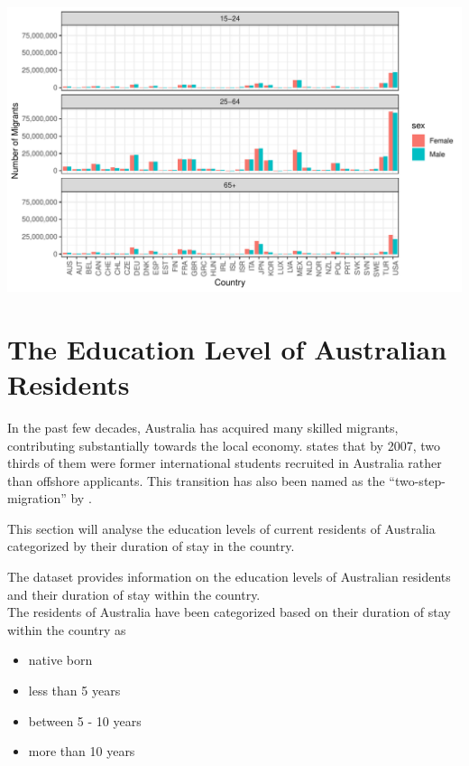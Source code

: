 \documentclass[11pt,a4paper,]{article}
\providecommand{\tightlist}{%
  \setlength{\itemsep}{0pt}\setlength{\parskip}{0pt}}
\let\origfigure\figure
\let\endorigfigure\endfigure
\renewenvironment{figure}[1][2] {
    \expandafter\origfigure\expandafter[H]
} {
    \endorigfigure
}%
\begin{document}
\begin{figure}
\centering
\includegraphics{ETC5513assignment4_files/figure-latex/agegap-1.pdf}
\caption{\label{fig:agegap}Gender difference in migrant population across age groups in countries}
\end{figure}

\pagebreak

\section* {The Education Level of Australian Residents}

In the past few decades, Australia has acquired many skilled migrants, contributing substantially towards the local economy. \textcite{hawthorne2010valuable} states that by 2007, two thirds of them were former international students recruited in Australia rather than offshore applicants. This transition has also been named as the ``two-step-migration'' by \textcite{hawthorne2010valuable}.

This section will analyse the education levels of current residents of Australia categorized by their duration of stay in the country.

The dataset provides information on the education levels of Australian residents and their duration of stay within the country.\\
The residents of Australia have been categorized based on their duration of stay within the country as

\begin{itemize}
\tightlist
\item
  native born
\item
  less than 5 years
\item
  between 5 - 10 years
\item
  more than 10 years
\end{itemize}
\end{document}
